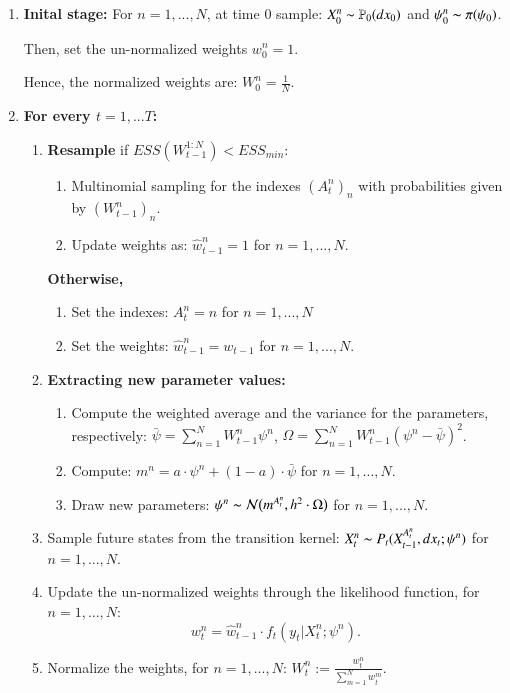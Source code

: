 \documentclass[
]{book}
\theoremstyle{break}
\theoremstyle{nonumberplain}
\begin{document}
\begin{enumerate}
    \item \textbf{Inital stage: }For $n=1,...,N$, at time 0 sample: $X_0^n\thicksim\mathbb P_0(dx_0)$ and $\psi_0^n\thicksim \pi(\psi_0)$.
    
    Then, set the un-normalized weights $w_0^n=1$.
    
    Hence, the normalized weights are: $W_0^n=\frac{1}{N}$.
    \item \textbf{For every $t=1,...T$:}
    \begin{enumerate}
        \item \textbf{Resample} if $ESS(W_{t-1}^{1:N})<ESS_{min}$:
\begin{enumerate}
    \item Multinomial sampling for the indexes $(A_t^n)_n$ with probabilities given by $(W_{t-1}^n)_{n}$.
    \item Update weights as: $\hat w_{t-1}^n = 1$ for $n=1,...,N$.
\end{enumerate}
\textbf{Otherwise, } 
\begin{enumerate}
    \item Set the indexes: $A_t^{n}=n$ for  $n=1,...,N$
    \item Set the weights: $\hat w_{t-1}^n = w_{t-1}$ for $n=1,...,N$.
\end{enumerate}
\item \textbf{Extracting new parameter values:}
\begin{enumerate}
    \item Compute the weighted average and the variance for the parameters, respectively: $\bar \psi = \sum_{n=1}^N W_{t-1}^n\psi^n$, $\Omega = \sum_{n=1}^N W_{t-1}^n(\psi^n-\bar \psi)^2$.
    \item Compute: $m^n=a\cdot  \psi^n+(1-a)\cdot \bar \psi$ for $n=1,...,N$.
    \item Draw new parameters: $\psi^n\thicksim \mathcal N\big(m^{A_t^n},h^2\cdot \Omega\big)$ for $n=1,...,N$.
\end{enumerate}
\item Sample future states from the transition kernel: $X_t^n\thicksim P_t(X_{t-1}^{A_t^n},dx_t; \psi^n)$ for $n=1,...,N$.
\item Update the un-normalized weights through the likelihood function, for $n=1,...,N$:
\begin{equation*}
    w_t^n=\hat w_{t-1}^n\cdot f_t(y_t|X_t^n;\psi^n).
\end{equation*}
\item Normalize the weights, for $n=1,...,N$:  $W_t^n:=\frac{w_t^n}{\sum_{m=1}^Nw_t^m}$.
    \end{enumerate}
\end{enumerate}
\end{document}
